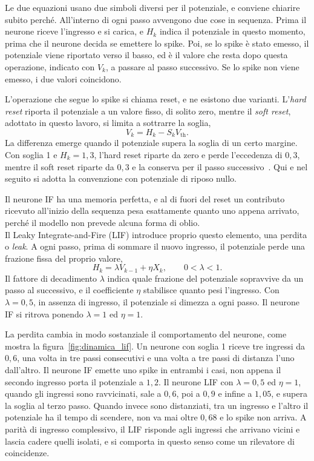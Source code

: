Le due equazioni usano due simboli diversi per il potenziale, e conviene chiarire subito perché. All'interno di ogni passo avvengono due cose in sequenza. Prima il neurone riceve l'ingresso e si carica, e $H_k$ indica il potenziale in questo momento, prima che il neurone decida se emettere lo spike. Poi, se lo spike è stato emesso, il potenziale viene riportato verso il basso, ed è il valore che resta dopo questa operazione, indicato con $V_k$, a passare al passo successivo. Se lo spike non viene emesso, i due valori coincidono.

L'operazione che segue lo spike si chiama reset, e ne esistono due varianti. L'\emph{hard reset} riporta il potenziale a un valore fisso, di solito zero, mentre il \emph{soft reset}, adottato in questo lavoro, si limita a sottrarre la soglia,
\begin{equation}
\label{eq:soft_reset}
V_k=H_k-S_k V_{\mathrm{th}}.
\end{equation}
La differenza emerge quando il potenziale supera la soglia di un certo margine. Con soglia 1 e $H_k=1{,}3$, l'hard reset riparte da zero e perde l'eccedenza di $0{,}3$, mentre il soft reset riparte da $0{,}3$ e la conserva per il passo successivo~\cite{han2020rmp}. Qui e nel seguito si adotta la convenzione con potenziale di riposo nullo.

Il neurone IF ha una memoria perfetta, e al di fuori del reset un contributo ricevuto all'inizio della sequenza pesa esattamente quanto uno appena arrivato, perché il modello non prevede alcuna forma di oblio.\\
Il Leaky Integrate-and-Fire (LIF) introduce proprio questo elemento, una perdita o \emph{leak}. A ogni passo, prima di sommare il nuovo ingresso, il potenziale perde una frazione fissa del proprio valore,
\begin{equation}
\label{eq:lif_decadimento_discreto}
H_k=\lambda V_{k-1}+\eta X_k,
\qquad 0<\lambda<1.
\end{equation}
Il fattore di decadimento $\lambda$ indica quale frazione del potenziale sopravvive da un passo al successivo, e il coefficiente $\eta$ stabilisce quanto pesi l'ingresso. Con $\lambda=0{,}5$, in assenza di ingresso, il potenziale si dimezza a ogni passo. Il neurone IF si ritrova ponendo $\lambda=1$ ed $\eta=1$.

La perdita cambia in modo sostanziale il comportamento del neurone, come mostra la figura~\ref{fig:dinamica_lif}. Un neurone con soglia 1 riceve tre ingressi da $0{,}6$, una volta in tre passi consecutivi e una volta a tre passi di distanza l'uno dall'altro. Il neurone IF emette uno spike in entrambi i casi, non appena il secondo ingresso porta il potenziale a $1{,}2$. Il neurone LIF con $\lambda=0{,}5$ ed $\eta=1$, quando gli ingressi sono ravvicinati, sale a $0{,}6$, poi a $0{,}9$ e infine a $1{,}05$, e supera la soglia al terzo passo. Quando invece sono distanziati, tra un ingresso e l'altro il potenziale ha il tempo di scendere, non va mai oltre $0{,}68$ e lo spike non arriva. A parità di ingresso complessivo, il LIF risponde agli ingressi che arrivano vicini e lascia cadere quelli isolati, e si comporta in questo senso come un rilevatore di coincidenze.

